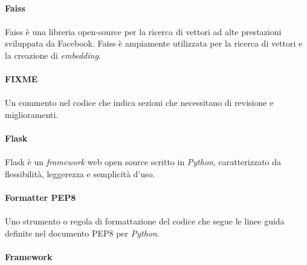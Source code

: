 \documentclass[10pt, a4paper]{article}
\begin{document}
\vspace{2em}
\paragraph{Faiss}\noindent\hrulefill
\paragraph{}Faiss è una libreria open-source per la ricerca di vettori ad alte prestazioni sviluppata da Facebook. Faiss è ampiamente utilizzata per la ricerca di vettori e la creazione di \textit{embedding\pg}.

\vspace{2em}
\paragraph{FIXME}\noindent\hrulefill
\paragraph{}Un commento nel codice che indica sezioni che necessitano di revisione e miglioramenti.


\vspace{2em}
\paragraph{Flask}\noindent\hrulefill
\paragraph{}Flask è un \textit{framework\pg} web open source scritto in \textit{Python\pg}, caratterizzato da flessibilità, leggerezza e semplicità d’uso.

\vspace{2em}
\paragraph{Formatter PEP8}\noindent\hrulefill
\paragraph{}Uno strumento o regola di formattazione del codice che segue le linee guida definite nel documento PEP8 per \textit{Python\pg}.


\vspace{2em}
\paragraph{Framework}\noindent\hrulefill
\end{document}
